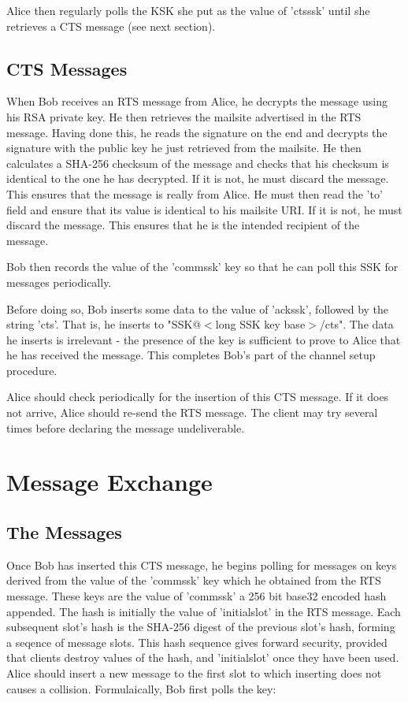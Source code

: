 \documentclass[12pt,a4paper]{article}
\begin{document}
Alice then regularly polls the KSK she put as the value of 'ctsssk' until she retrieves a CTS message (see next section).

\subsection{CTS Messages}
When Bob receives an RTS message from Alice, he decrypts the message using his RSA private key. He then retrieves the mailsite advertised in the RTS message. Having done this, he reads the signature on the end and decrypts the signature with the public key he just retrieved from the mailsite. He then calculates a SHA-256 checksum of the message and checks that his checksum is identical to the one he has decrypted. If it is not, he must discard the message. This ensures that the message is really from Alice. He must then read the 'to' field and ensure that its value is identical to his mailsite URI. If it is not, he must discard the message. This ensures that he is the intended recipient of the message.

Bob then records the value of the 'commssk' key so that he can poll this SSK for messages periodically.

Before doing so, Bob inserts some data to the value of 'ackssk', followed by the string 'cts'. That is, he inserts to "SSK@$<$long SSK key base$>$/cts". The data he inserts is irrelevant - the presence of the key is sufficient to prove to Alice that he has received the message. This completes Bob's part of the channel setup procedure.

Alice should check periodically for the insertion of this CTS message. If it does not arrive, Alice should re-send the RTS message. The client may try several times before declaring the message undeliverable.

\section{Message Exchange}
\subsection{The Messages}
Once Bob has inserted this CTS message, he begins polling for messages on keys derived from the value of the 'commssk' key which he obtained from the RTS message. These keys are the value of 'commssk' a 256 bit base32 encoded hash appended. The hash is initially the value of 'initialslot' in the RTS message. Each subsequent slot's hash is the SHA-256 digest of the previous slot's hash, forming a seqence of message slots. This hash sequence gives forward security, provided that clients destroy values of the hash, and 'initialslot' once they have been used. Alice should insert a new message to the first slot to which inserting does not causes a collision. Formulaically, Bob first polls the key:
\end{document}
